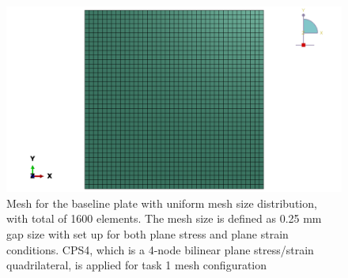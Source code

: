 \documentclass[12pt]{article}
\begin{document}
\begin{figure}[H]
    \centering
    \includegraphics[width=1\textwidth]{images/MeshQ1.png}
    \caption{Mesh for the baseline plate with uniform mesh size distribution, 
    with total of 1600 elements. The mesh size is defined as 0.25 mm
    gap size with set up for both plane stress and plane strain
    conditions. CPS4, which is a 4-node bilinear plane stress/strain quadrilateral, is applied for task 1 mesh configuration}
    \label{fig:MeshQ1}
\end{figure}
\end{document}
